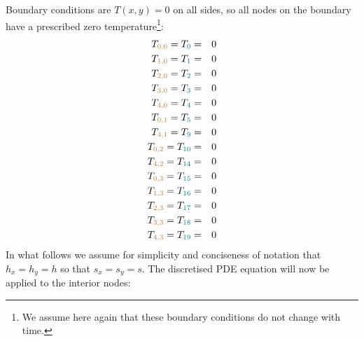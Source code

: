 Boundary conditions are $T(x,y)=0$ on all sides, so all nodes 
on the boundary have a prescribed zero temperature\footnote{We assume
here again that these boundary conditions do not change with time.}:
\begin{eqnarray}
T_{\color{brown}0,0} = T_{\color{teal} 0} &=& 0 \nonumber\\
T_{\color{brown}1,0} = T_{\color{teal} 1} &=& 0 \nonumber\\
T_{\color{brown}2,0} = T_{\color{teal} 2} &=& 0 \nonumber\\
T_{\color{brown}3,0} = T_{\color{teal} 3} &=& 0 \nonumber\\
T_{\color{brown}4,0} = T_{\color{teal} 4} &=& 0 \nonumber\\
T_{\color{brown}0,1} = T_{\color{teal} 5} &=& 0 \nonumber\\
T_{\color{brown}4,1} = T_{\color{teal} 9} &=& 0 \nonumber\\
T_{\color{brown}0,2} = T_{\color{teal} 10} &=& 0 \nonumber\\
T_{\color{brown}4,2} = T_{\color{teal} 14} &=& 0 \nonumber\\
T_{\color{brown}0,3} = T_{\color{teal} 15} &=& 0 \nonumber\\
T_{\color{brown}1,3} = T_{\color{teal} 16} &=& 0 \nonumber\\
T_{\color{brown}2,3} = T_{\color{teal} 17} &=& 0 \nonumber\\
T_{\color{brown}3,3} = T_{\color{teal} 18} &=& 0 \nonumber\\
T_{\color{brown}4,3} = T_{\color{teal} 19} &=& 0 \nonumber
\end{eqnarray}
In what follows we assume for simplicity and conciseness of notation that 
$h_x=h_y=h$ so that $s_x=s_y=s$.
The discretised PDE equation will now be applied to the interior nodes:

